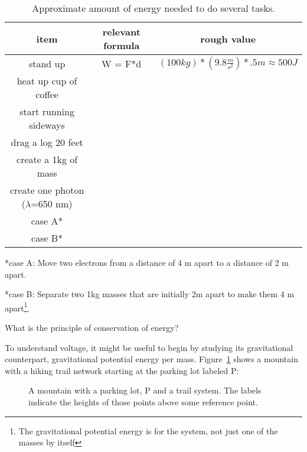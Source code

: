 \begin{table}[H]
\begin{center}
\begin{tabular}{|c| c| c|} \hline
item & relevant formula	& rough value \\ \hline
stand up	& W = F*d	& $(100kg)*(9.8 \frac{m}{s^2})*.5 m \approx 500J$\\ \hline
heat up cup of coffee &	& \\ \hline
start running sideways	&	&\\ \hline
drag a log 20 feet	&	&\\ \hline
create a 1kg of mass	&	&\\ \hline
create one photon ($\lambda$=650 nm)	&	&	\\ \hline
case A*			&	&\\ \hline
case B*			&	&\\ \hline
\end{tabular}
\caption{Approximate amount of energy needed to do several tasks.}
\end{center}
\end{table}

\noindent
*case A: Move two electrons from a distance of 4 m apart to a distance of 2 m apart.
\par
\noindent
*case B: Separate two 1kg masses that are initially 2m apart to make them 4 m apart\footnote{The gravitational potential energy is for the system, not just one of the masses by itself}.
\linebreak

\begin{blevel}
What is the principle of conservation of energy?
\end{blevel}

\par
To understand voltage, it might be useful to begin by studying its gravitational counterpart, gravitational potential energy per mass. Figure~\ref{F:2MT} shows a mountain with a hiking trail network starting at the parking lot labeled P:
\par
\begin{figure}[H]
\begin{center}
\caption{A mountain with a parking lot, P and a trail system. The labels indicate the heights of those points above some reference point.}
\label{F:2MT}
\end{center}
\end{figure}

